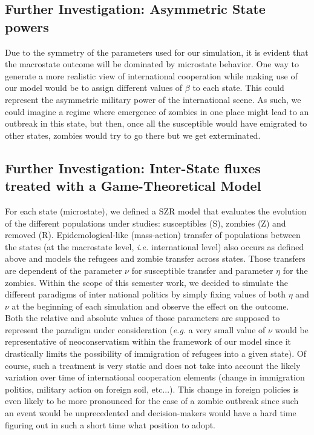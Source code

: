 \documentclass[11pt]{article} %
\begin{document}
\subsection{Further Investigation: Asymmetric State powers}\indent

Due to the symmetry of the parameters used for our simulation, it is evident that the macrostate outcome will be dominated by microstate behavior. One way to generate a more realistic view of international cooperation while making use of our model would be to assign different values of $\beta$ to each state. This could represent the asymmetric military power of the international scene. As such, we could imagine a regime where emergence of zombies in one place might lead to an outbreak in this state, but then, once all the susceptible would have emigrated to other states, zombies would try to go there but we get exterminated.

\subsection{Further Investigation: Inter-State fluxes treated with a Game-Theoretical Model}\indent
\label{sec:gt}

For each state (microstate), we defined a SZR model that evaluates the evolution of the different populations under studies: susceptibles (S), zombies (Z) and removed (R). Epidemological-like (mass-action) transfer of populations between the states (at the macrostate level, \textit{i.e.} international level) also occurs as defined above and models the refugees and zombie transfer across states. Those transfers are dependent of the parameter $\nu$ for susceptible transfer and parameter $\eta$ for the zombies. Within the scope of this semester work, we decided to simulate the different paradigms of inter national politics by simply fixing values of both $\eta$ and $\nu$ at the beginning of each simulation and observe the effect on the outcome. Both the relative and absolute values of those parameters are supposed to represent the paradigm under consideration (\textit{e.g.} a very small value of $\nu$ would be representative of neoconservatism within the framework of our model since it drastically limits the possibility of immigration of refugees into a given state). Of course, such a treatment is very static and does not take into account the likely variation over time of  international cooperation elements (change in immigration politics, military action on foreign soil, etc...). This change in foreign policies is even likely to be more pronounced for the case of a zombie outbreak since such an event would be unprecedented and decision-makers would have a hard time figuring out in such a short time what position to adopt. 
\end{document}
